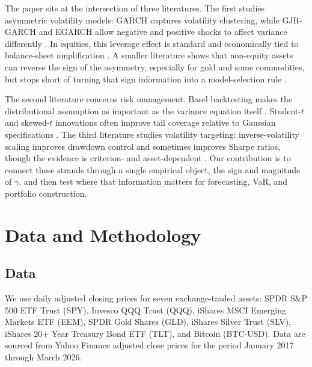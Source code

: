 The paper sits at the intersection of three literatures. The first studies asymmetric volatility models: GARCH captures volatility clustering, while GJR-GARCH and EGARCH allow negative and positive shocks to affect variance differently \citep{bollerslev1986,glosten1993,nelson1991}. In equities, this leverage effect is standard and economically tied to balance-sheet amplification \citep{black1976,christie1982,engle2018}. A smaller literature shows that non-equity assets can reverse the sign of the asymmetry, especially for gold and some commodities, but stops short of turning that sign information into a model-selection rule \citep{chevallier2017,batten2010,chang2021}.

The second literature concerns risk management. Basel backtesting makes the distributional assumption as important as the variance equation itself \citep{bcbs2006,bcbs2019,kupiec1995,christoffersen1998}. Student-$t$ and skewed-$t$ innovations often improve tail coverage relative to Gaussian specifications \citep{bollerslev1987,hansen1994,kuester2006}. The third literature studies volatility targeting: inverse-volatility scaling improves drawdown control and sometimes improves Sharpe ratios, though the evidence is criterion- and asset-dependent \citep{fleming2001,fleming2003,moreira2017,harvey2018,cederburg2020,bozovic2024,demiguel2024,hood2025,xu2024}. Our contribution is to connect these strands through a single empirical object, the sign and magnitude of $\gamma$, and then test where that information matters for forecasting, VaR, and portfolio construction.



\section{Data and Methodology}\label{sec:data_methodology}

\subsection{Data}
\label{sec:data}

We use daily adjusted closing prices for seven exchange-traded assets: SPDR S\&P 500 ETF Trust (SPY), Invesco QQQ Trust (QQQ), iShares MSCI Emerging Markets ETF (EEM), SPDR Gold Shares (GLD), iShares Silver Trust (SLV), iShares 20+ Year Treasury Bond ETF (TLT), and Bitcoin (BTC-USD). Data are sourced from Yahoo Finance adjusted close prices for the period January 2017 through March 2026.

